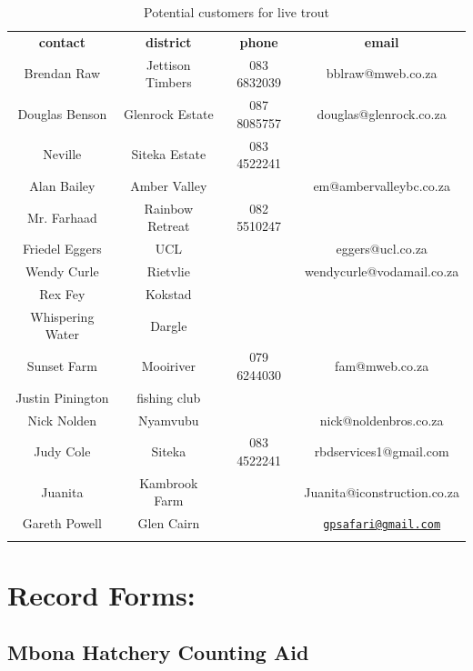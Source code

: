 \begin{appendices}
\begin{table}[H]
  \centering
 \begin{tabular}{|c|c|c|c|}
 \thickhline
   {\bf contact} & {\bf district} & {\bf phone} & {\bf email}  \\ \thickhline
    Brendan Raw & Jettison Timbers & 083 6832039  & bblraw@mweb.co.za \\ \hline 
     Douglas Benson & Glenrock Estate & 087 8085757 & douglas@glenrock.co.za \\ \hline
     Neville & Siteka Estate & 083 4522241 & \\ \hline
    Alan Bailey & Amber Valley & & em@ambervalleybc.co.za\\ \hline
    Mr. Farhaad & Rainbow Retreat & 082 5510247 & \\ \hline
    Friedel Eggers & UCL &  & eggers@ucl.co.za \\ \hline
    Wendy Curle & Rietvlie &  & wendycurle@vodamail.co.za\\ \hline
    Rex Fey & Kokstad &  & \\ \hline
     Whispering Water & Dargle &  & \\ \hline
     Sunset Farm & Mooiriver & 079 6244030 & fam@mweb.co.za \\ \hline
     Justin Pinington & fishing club & & \\ \hline
      Nick Nolden & Nyamvubu & & nick@noldenbros.co.za \\ \hline
     Judy Cole & Siteka & 083 4522241 & rbdservices1@gmail.com \\ \hline
     Juanita & Kambrook Farm & & Juanita@iconstruction.co.za \\ \hline
     Gareth Powell & Glen Cairn & & \href{mailto:gpsafari@gmail.com}{\nolinkurl{gpsafari@gmail.com}} \\ \hline
                   \thickhline
  \end{tabular} 
  \caption{Potential customers for live trout}
  \label{tab:CustomerContactDetails}
\end{table}

\newpage

\section{Record Forms:}

\clearpage\pagestyle{empty}
\begin{landscape}

\subsection{Mbona Hatchery Counting Aid}



\end{landscape}
\end{appendices}
